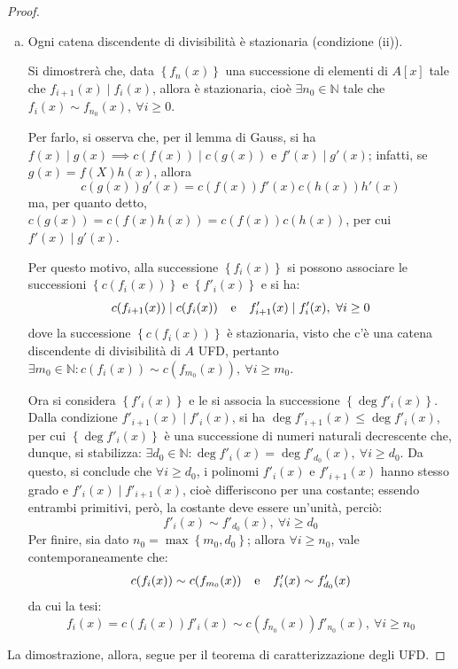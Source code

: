 \documentclass[11pt]{article}
\theoremstyle{style}
\numberwithin{equation}{subsection}
\begin{document}
\begin{proof}
\begin{enumerate}[(a).]
\begin{itemize}
				\end{itemize}



			\item Ogni catena discendente di divisibilit\`a \`e stazionaria (condizione (ii)).

				Si dimostrer\`a che, data $\left\{ f_n(x) \right\} $ una successione di elementi di $A[x]$ tale che $f_{i+1} (x)  \mid f_i(x)$, allora \`e stazionaria, cio\`e $\exists n_0 \in \mathbb{N}$ tale che $f_i(x) \sim f_{n_0} (x) , \ \forall i\ge 0$.

				Per farlo, si osserva che, per il lemma di Gauss, si ha $f(x)  \mid g(x) \implies c(f(x))  \mid c(g(x)) $ e $f'(x)  \mid g'(x)$; infatti, se $g(x) = f(X) h(x)$, allora
				\[
				c(g(x))g'(x) = c(f(x)) f'(x) c(h(x)) h'(x)
				\] 
				ma, per quanto detto, $c(g(x)) = c(f(x) h(x))= c(f(x)) c(h(x))$, per cui $f'(x)  \mid g'(x)$.

				Per questo motivo, alla successione $\left\{ f_i(x) \right\} $ si possono associare le successioni $\left\{ c(f_i(x)) \right\} $ e $\left\{ f'_i(x) \right\} $ e si ha:
				\[
				c(f_{i+1} (x)) \mid c(f_i(x)) \hspace{.25cm} \text{ e } \hspace{.25cm} f'_{i+1} (x)  \mid f'_i(x) , \ \forall i\ge 0
				\] 
				dove la successione $\left\{ c(f_i(x)) \right\} $ \`e stazionaria, visto che c'\`e una catena discendente di divisibilit\`a di $A$ UFD, pertanto $\exists m_0 \in \mathbb{N} : c(f_i(x)) \sim c(f_{m_0} (x)) , \ \forall i\ge m_0 $.

				Ora si considera $\left\{ f'_i(x) \right\} $ e le si associa la successione $\left\{ \operatorname{deg} f'_i(x) \right\} $.
				Dalla condizione $f'_{i+1} (x)  \mid f'_i(x)  $, si ha $\operatorname{deg} f'_{i+1} (x)  \le \operatorname{deg} f'_i(x)$, per cui $\left\{ \operatorname{deg} f'_i(x) \right\} $ \`e una successione di numeri naturali decrescente che, dunque, si stabilizza: $\exists d_0 \in \mathbb{N} : \operatorname{deg} f'_i(x) = \operatorname{deg} f'_{d_0} (x) ,\ \forall i \ge d_0$.
				Da questo, si conclude che $\forall i\ge d_0$, i polinomi $f'_i(x)$ e $f'_{i+1} (x)$ hanno stesso grado e $f'_i(x)  \mid f'_{i+1} (x)$, cio\`e differiscono per una costante; essendo entrambi primitivi, per\`o, la costante deve essere un'unit\`a, perci\`o:
				\[
				f'_i(x) \sim f'_{d_0} (x), \ \forall i \ge d_0
				\] 
				Per finire, sia dato $n_0 = \max \left\{ m_0,d_0 \right\}$; allora $\forall i\ge n_0$, vale contemporaneamente che:
				\[
				c(f_i(x)) \sim c(f_{m_0} (x)) \hspace{.25cm} \text{ e } \hspace{.25cm} f'_i(x) \sim f'_{d_0} (x)
				\] 
				da cui la tesi:
				\[
				f_i(x) = c(f_i(x)) f'_i(x) \sim c(f_{n_0} (x)) f'_{n_0} (x) , \ \forall i\ge n_0
				\] 
		\end{enumerate}
		La dimostrazione, allora, segue per il teorema di caratterizzazione degli UFD.
	\end{proof}
\end{document}
